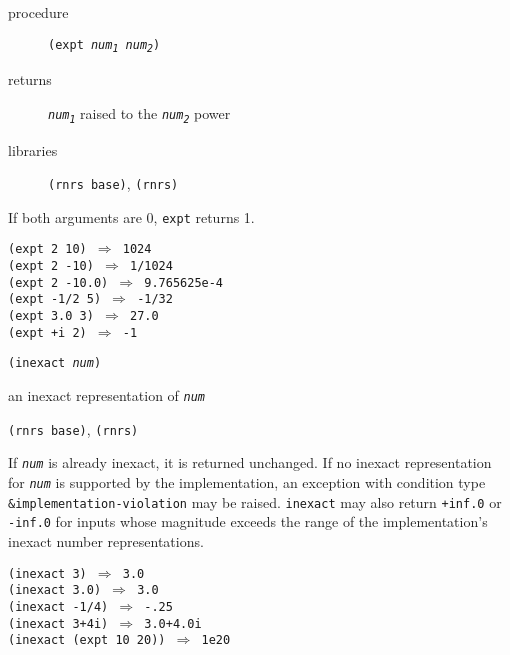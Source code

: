 \begin{description}

\label{objects_s111}\item[procedure] \texttt{(expt \textit{num\textsubscript{1}} \textit{num\textsubscript{2}})}



\item[returns] \texttt{\textit{num\textsubscript{1}}} raised to the \texttt{\textit{num\textsubscript{2}}} power


\item[libraries] \texttt{(rnrs base)}, \texttt{(rnrs)}
\end{description}


If both arguments are 0, \texttt{expt} returns 1.


\begin{alltt}
(expt 2 10) \(\Rightarrow\) 1024
(expt 2 -10) \(\Rightarrow\) 1/1024
(expt 2 -10.0) \(\Rightarrow\) 9.765625e-4
(expt -1/2 5) \(\Rightarrow\) -1/32
(expt 3.0 3) \(\Rightarrow\) 27.0
(expt +i 2) \(\Rightarrow\) -1
\end{alltt}

\begin{description}

\label{objects_s112}\item[procedure] \texttt{(inexact \textit{num})}



\item[returns] an inexact representation of \texttt{\textit{num}}


\item[libraries] \texttt{(rnrs base)}, \texttt{(rnrs)}
\end{description}


\label{objects_s113}If \texttt{\textit{num}} is already inexact, it is returned unchanged.
If no inexact representation for \texttt{\textit{num}} is supported by the
implementation, an exception with condition type \texttt{\&{}implementation-violation}
may be raised.
\texttt{inexact} may also return \texttt{+inf.0} or \texttt{-inf.0} for inputs
whose magnitude exceeds the range of the implementation's inexact number
representations.


\begin{alltt}
(inexact 3) \(\Rightarrow\) 3.0
(inexact 3.0) \(\Rightarrow\) 3.0
(inexact -1/4) \(\Rightarrow\) -.25
(inexact 3+4i) \(\Rightarrow\) 3.0+4.0i
(inexact (expt 10 20)) \(\Rightarrow\) 1e20
\end{alltt}

